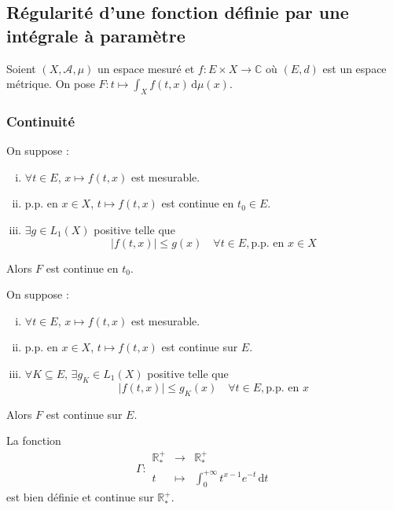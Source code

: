 




	\subsection{Régularité d'une fonction définie par une intégrale à paramètre}

	Soient $(X, \mathcal{A}, \mu)$ un espace mesuré et $f : E \times X \rightarrow \mathbb{C}$ où $(E, d)$ est un espace métrique. On pose $F : t \mapsto \int_X f(t, x) \, \mathrm{d}\mu(x)$.

	\subsubsection{Continuité}


	\begin{theorem}
		On suppose :
		\begin{enumerate}[(i)]
			\item $\forall t \in E$, $x \mapsto f(t,x)$ est mesurable.
			\item p.p. en $x \in X$, $t \mapsto f(t,x)$ est continue en $t_0 \in E$.
			\item $\exists g \in L_1(X)$ positive telle que
			\[ |f(t,x)| \leq g(x) \quad \forall t \in E, \text{p.p. en } x \in X \]
		\end{enumerate}
		Alors $F$ est continue en $t_0$.
	\end{theorem}

	\begin{corollary}
		On suppose :
		\begin{enumerate}[(i)]
			\item $\forall t \in E$, $x \mapsto f(t,x)$ est mesurable.
			\item p.p. en $x \in X$, $t \mapsto f(t,x)$ est continue sur $E$.
			\item $\forall K \subseteq E, \, \exists g_K \in L_1(X)$ positive telle que
			\[ |f(t,x)| \leq g_K(x) \quad \forall t \in E, \text{p.p. en } x \]
		\end{enumerate}
		Alors $F$ est continue sur $E$.
	\end{corollary}


	\begin{example}
		\label{239-1}
		La fonction
		\[ \Gamma :
		\begin{array}{ccc}
			\mathbb{R}^+_* &\rightarrow& \mathbb{R}^+_* \\
			t &\mapsto& \int_{0}^{+\infty} t^{x-1} e^{-t} \, \mathrm{d}t
		\end{array}
		\]
		est bien définie et continue sur $\mathbb{R}^+_*$.
	\end{example}

